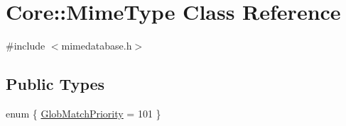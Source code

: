 \hypertarget{class_core_1_1_mime_type}{\section{Core\-:\-:Mime\-Type Class Reference}
\label{class_core_1_1_mime_type}
}


{\ttfamily \#include $<$mimedatabase.\-h$>$}

\subsection*{Public Types}
\begin{DoxyCompactItemize}
\item 
enum \{ \hyperlink{group___core_plugin_gga3a6cca41b520f5ab1d19c6cf37f6f1e7a3b3eb7b9aa0a00542cc996191befdcd6}{Glob\-Match\-Priority} = 101
 \}
\end{DoxyCompactItemize}
